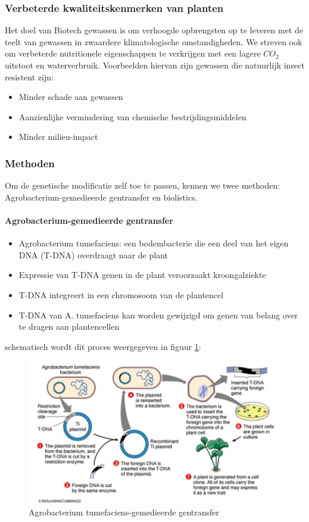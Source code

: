 \documentclass[a4paper,kul]{kulakarticle} %
\begin{document}
\subsubsection{Verbeterde kwaliteitskenmerken van planten}
Het doel van Biotech gewassen is om verhoogde opbrengsten op te leveren met de teelt van gewassen in zwaardere klimatologische omstandigheden. We streven ook om verbeterde nutritionele eigenschappen te verkrijgen met een lagere $CO_2$ uitstoot en waterverbruik. Voorbeelden hiervan zijn gewassen die natuurlijk insect resistent zijn:
\begin{itemize}
	\item Minder schade aan gewassen
	\item Aanzienlijke vermindering van chemische bestrijdingsmiddelen
	\item Minder milieu-impact
\end{itemize}

\subsubsection{Methoden}
Om de genetische modificatie zelf toe te passen, kennen we twee methoden: Agrobacterium-gemedieerde gentransfer en biolistics.
\paragraph{Agrobacterium-gemedieerde gentransfer}
\begin{itemize}
	\item Agrobacterium tumefaciens: een bodembacterie die een deel van het
	eigen DNA (T-DNA) overdraagt naar de plant
	\item Expressie van T-DNA genen in de plant veroorzaakt kroongalziekte
	\item T-DNA integreert in een chromosoom van de plantencel
	\item T-DNA van A. tumefaciens kan worden gewijzigd om genen van
	belang over te dragen aan plantencellen
\end{itemize}
schematisch wordt dit proces weergegeven in figuur \ref{fig:agrobacterium}:
\begin{figure}[h]
	\centering
	\includegraphics[width=0.5\linewidth]{Agrobacterium}
	\caption[Agro bacerium]{Agrobacterium tumefaciens-gemedieerde gentransfer}
	\label{fig:agrobacterium}
\end{figure}
\end{document}
